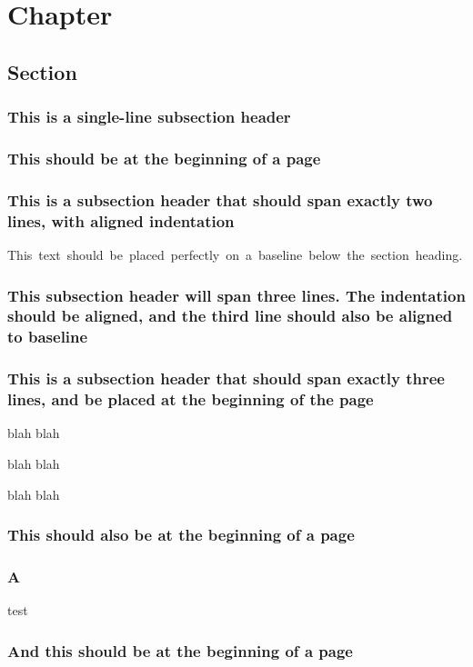\documentclass[baselinegrid,noprint,nocopyright]{uit-thesis-test}
\begin{document}
\mainmatter

\chapter{Chapter}
\section{Section}
\subsection{This is a single-line subsection header}
\lipsum[1]

\lipsum[3-7]

\subsection{This should be at the beginning of a page}
\lipsum[8]

\subsection{This is a subsection header that should span exactly two lines, with aligned indentation}
\mbox{This~text~should~be~placed~perfectly~on~a~baseline~below~the~section~heading.}

\lipsum[9]

\subsection{This subsection header will span three lines. The indentation should be aligned, and the third line should also be aligned to baseline}
\lipsum[10-15]

\subsection{This is a subsection header that should span exactly three lines, and be placed at the beginning of the page}

\lipsum[16-18]

blah blah

blah blah

blah blah



\subsection{This should also be at the beginning of a page}
\subsection{A}
test

\newpage
\subsection{And this should be at the beginning of a page}
\end{document}
